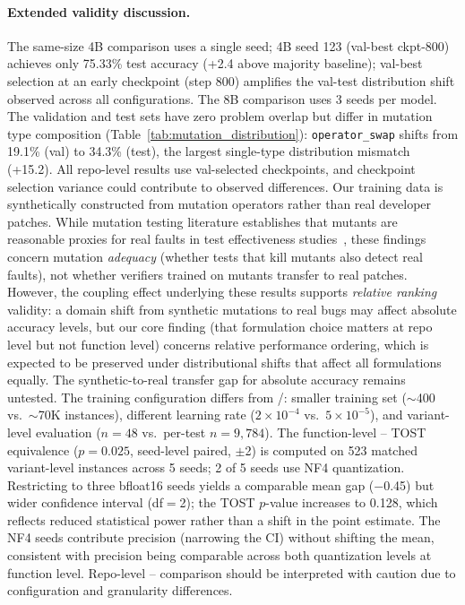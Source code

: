 \paragraph{Extended validity discussion.}
\label{app:limitations}
The same-size 4B comparison uses a single seed; \cls{} 4B seed 123 (val-best ckpt-800) achieves only 75.33\% test accuracy (+2.4\pp{} above majority baseline); val-best selection at an early checkpoint (step 800) amplifies the val-test distribution shift observed across all configurations. The \cwm{} 8B comparison uses 3 seeds per model. The validation and test sets have zero problem overlap but differ in mutation type composition (Table~\ref{tab:mutation_distribution}): \texttt{operator\_swap} shifts from 19.1\% (val) to 34.3\% (test), the largest single-type distribution mismatch (+15.2\pp{}). All repo-level results use val-selected checkpoints, and checkpoint selection variance could contribute to observed differences. Our training data is synthetically constructed from mutation operators rather than real developer patches. While mutation testing literature establishes that mutants are reasonable proxies for real faults in test effectiveness studies~\cite{andrews2005mutation,just2014mutants}, these findings concern mutation \emph{adequacy} (whether tests that kill mutants also detect real faults), not whether verifiers trained on mutants transfer to real patches. However, the coupling effect underlying these results supports \emph{relative ranking} validity: a domain shift from synthetic mutations to real bugs may affect absolute accuracy levels, but our core finding (that formulation choice matters at repo level but not function level) concerns relative performance ordering, which is expected to be preserved under distributional shifts that affect all formulations equally. The synthetic-to-real transfer gap for absolute accuracy remains untested. The \traj{} training configuration differs from \cls{}/\cwm{}: smaller training set (${\sim}$400 vs.\ ${\sim}$70K instances), different learning rate ($2{\times}10^{-4}$ vs.\ $5{\times}10^{-5}$), and variant-level evaluation ($n{=}48$ vs.\ per-test $n{=}9{,}784$). The function-level \cls{}--\traj{} TOST equivalence ($p = 0.025$, seed-level paired, $\pm$2\pp{}) is computed on 523 matched variant-level instances across 5 seeds; 2 of 5 seeds use NF4 quantization. Restricting to three bfloat16 seeds yields a comparable mean gap ($-$0.45\pp{}) but wider confidence interval (df${=}$2); the TOST $p$-value increases to 0.128, which reflects reduced statistical power rather than a shift in the point estimate. The NF4 seeds contribute precision (narrowing the CI) without shifting the mean, consistent with precision being comparable across both quantization levels at function level. Repo-level \cls{}--\traj{} comparison should be interpreted with caution due to configuration and granularity differences.

